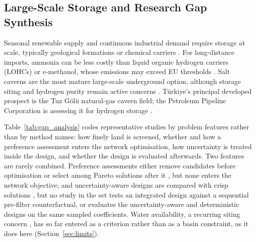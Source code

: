 \documentclass[preprint,12pt,authoryear]{elsarticle}
\begin{document}
\subsection{Large-Scale Storage and Research Gap Synthesis}
Seasonal renewable supply and continuous industrial demand require storage at scale, typically geological formations or chemical carriers \citep{ma2024large,frischmuth2024quantifying}. For long-distance imports, ammonia can be less costly than liquid organic hydrogen carriers (LOHCs) or e-methanol, whose emissions may exceed EU thresholds \citep{scheffler2025techno}. Salt caverns are the most mature large-scale underground option, although storage siting and hydrogen purity remain active concerns \citep{karakilcik2020underground,jahanbakhsh2024underground,deveci2018site,harati2024multi,janssen2025assessment}. Türkiye's principal developed prospect is the Tuz Gölü natural-gas cavern field; the Petroleum Pipeline Corporation is assessing it for hydrogen storage \citep{ozarslan2012,san2019tuz,baki2022botas}.

Table~\ref{tab:gap_analysis} codes representative studies by problem features rather than by method names: how finely land is screened, whether and how a preference assessment enters the network optimisation, how uncertainty is treated inside the design, and whether the design is evaluated afterwards. Two features are rarely combined. Preference assessments either remove candidates before optimisation \citep{gezen2026spatial,zhou2026collaborative} or select among Pareto solutions after it \citep{ochoarobles2020optimization}, but none enters the network objective; and uncertainty-aware designs are compared with crisp solutions \citep{ochoarobles2020optimization}, but no study in the set tests an integrated design against a sequential pre-filter counterfactual, or evaluates the uncertainty-aware and deterministic designs on the same sampled coefficients. Water availability, a recurring siting concern \citep{tonelli2023global,sekeroglu2026water}, has so far entered as a criterion rather than as a basin constraint, as it does here (Section~\ref{sec:limits}).
\end{document}
